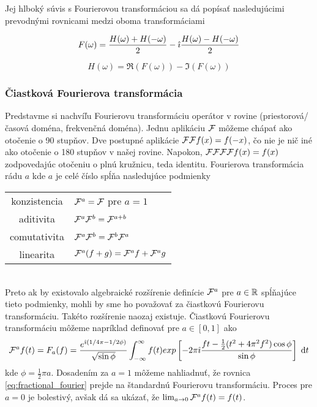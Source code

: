 Jej hlboký súvis s Fourierovou transformáciou sa dá popísať
nasledujúcimi prevodnými rovnicami medzi oboma transformáciami

\begin{equation}
    F(\omega) = \frac{H(\omega)+H(-\omega)}{2} 
                -\hat{\imath} \frac{H(\omega) - H(-\omega)}{2}
\end{equation}

\begin{equation}
 H(\omega) = \Re(F(\omega)) - \Im(F(\omega))
\end{equation}

\subsubsection{Čiastková Fourierova transformácia}
Predstavme si nachvíľu Fourierovu transformáciu operátor
v rovine (priestorová/časová doména, frekvenčná doména).
Jednu aplikáciu $\mathcal{F}$ môžeme chápať ako otočenie o 90 stupňov.
Dve postupné aplikácie $\mathcal{F}\mathcal{F} f(x) = f(-x)$, čo nie je nič
iné ako otočenie o 180 stupňov v našej rovine. Napokon,
$\mathcal{F}\mathcal{F}\mathcal{F}\mathcal{F} f(x) = f(x)$ zodpovedajúc otočeniu o
plnú kružnicu, teda identitu.
Fourierova transformácia rádu $a$ kde $a$ je celé číslo spĺňa
nasledujúce podmienky \\
\begin{tabular}{c l}
    konzistencia& $\mathcal{F}^a = \mathcal{F}$ pre $a=1$ \\
    aditivita& $\mathcal{F}^a \mathcal{F}^b = \mathcal{F}^{a+b}$ \\
    comutativita & $\mathcal{F}^a \mathcal{F}^b = \mathcal{F}^b \mathcal{F}^a$ \\
    linearita& $\mathcal{F}^a(f+g) = \mathcal{F}^a f + \mathcal{F}^a g$
\end{tabular}\\
Preto ak by existovalo algebraické rozšírenie definície $\mathcal{F}^a$
pre $a\in {\mathbb R}$ spĺňajúce tieto
podmienky, mohli by sme ho považovať za čiastkovú Fourierovu
transformáciu. Takéto rozšírenie naozaj existuje.
Čiastkovú Fourierovu transformáciu môžeme napríklad definovať pre
$a\in[0,1]$ ako
\begin{equation}
    \mathcal{F}^a f(t) = F_a(f) =
        \frac{e^{\hat{\imath}( 1/4 \pi - 1/2 \phi)}}{\sqrt{\sin \phi}}
        \int_{-\infty}^{\infty} f(t) exp\left[ 
            -2\pi\hat{\imath} \frac{f t - \frac{1}{2}( t^2 + 4 \pi^2 f^2)
            \cos\phi }{\sin \phi}
        \right] \; \mathrm{d} t
    \label{eq:fractional_fourier}
\end{equation}
kde $\phi = \frac{1}{2} \pi a$.
Dosadením za $a=1$ môžeme nahliadnuť, že rovnica
\ref{eq:fractional_fourier} prejde na štandardnú Fourierovu
transformáciu. Proces pre $a=0$ je bolestivý, avšak dá sa ukázať, že
$\lim_{a\rightarrow0} \mathcal{F}^a f(t) = f(t)$.

